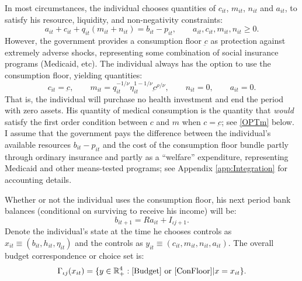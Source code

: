 \documentclass[12pt,pdftex,letterpaper]{article}
\newcommand{\R}{\mathbb{R}}
\newcommand{\Type}{\iota}
\newcommand{\Health}{h}
\newcommand{\Inc}{I}
\newcommand{\Con}{c}
\newcommand{\Care}{m}
\newcommand{\Invst}{n}
\newcommand{\Bank}{b}
\newcommand{\Assets}{a}
\newcommand{\Rfree}{R}
\newcommand{\Premium}{p}
\newcommand{\Copay}{q}
\newcommand{\ConFloor}{\underbar{\Con}}
\newcommand{\CRRAcon}{\rho}
\newcommand{\CRRAcare}{\nu}
\newcommand{\Age}{j}
\newcommand{\MedShk}{\eta}
\newcommand{\BudgetCorr}{\Gamma}
\newcommand{\State}{x}
\newcommand{\Control}{y}
\begin{document}
In most circumstances, the individual chooses quantities of  $\Con_{it}$, $\Care_{it}$, $\Invst_{it}$ and $\Assets_{it}$, to satisfy his resource, liquidity, and non-negativity constraints:
\begin{equation}\label{Budget}
\Assets_{it} + \Con_{it} + \Copay_{it} (\Care_{it} + \Invst_{it}) = \Bank_{it} - \Premium_{it}, \qquad \Assets_{it},\Con_{it}, \Care_{it}, \Invst_{it} \geq 0.
\end{equation}
However, the government provides a consumption floor $\ConFloor$ as protection against extremely adverse shocks, representing some combination of social insurance programs (Medicaid, etc).  The individual always has the option to use the consumption floor, yielding quantities:
\begin{equation}\label{ConFloor}
\Con_{it} = \ConFloor, \qquad \Care_{it} = \Copay_{it}^{-1/\CRRAcare} \MedShk_{it}^{1-1/\CRRAcare} \ConFloor^{\CRRAcon/\CRRAcare}, \qquad \Invst_{it} = 0, \qquad \Assets_{it} = 0.
\end{equation}
That is, the individual will purchase no health investment and end the period with zero assets.  His quantity of medical consumption is the quantity that \textit{would} satisfy the first order condition between $\Con$ and $\Care$ when $\Con=\ConFloor$; see \eqref{OPTm} below.  I assume that the government pays the difference between the individual's available resources $\Bank_{it} - \Premium_{it}$ and the cost of the consumption floor bundle partly through ordinary insurance and partly as a ``welfare'' expenditure, representing Medicaid and other means-tested programs; see Appendix \ref{app:Integration} for accounting details.

Whether or not the individual uses the consumption floor, his next period bank balances (conditional on surviving to receive his income) will be:
\begin{equation}\label{BankNext}
\Bank_{it+1} = \Rfree \Assets_{it} + \Inc_{\Type \Age+1}.
\end{equation}
Denote the individual's state at the time he chooses controls as $\State_{it} \equiv (\Bank_{it},\Health_{it},\MedShk_{it})$ and the controls as $\Control_{it} \equiv (\Con_{it},\Care_{it},\Invst_{it},\Assets_{it})$.  The overall budget correspondence or choice set is:
\begin{equation}\label{ChoiceSet}
\BudgetCorr_{\iota j}(\State_{it}) = \{ \Control \in \R^4_+ : \text{\eqref{Budget} or \eqref{ConFloor}} | \State=\State_{it} \}.
\end{equation} 
\end{document}
